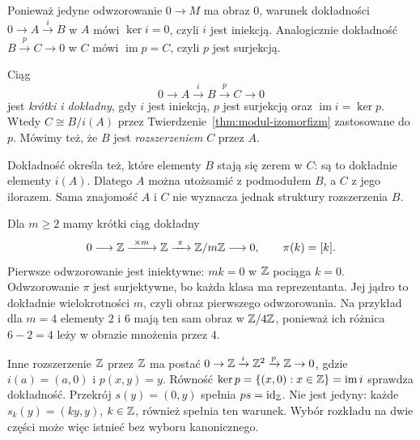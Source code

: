 Ponieważ jedyne odwzorowanie $0\to M$ ma obraz $0$,
warunek dokładności $0\to A\xrightarrow{i}B$
w $A$ mówi $\ker i=0$, czyli $i$ jest iniekcją.
Analogicznie dokładność
$B\xrightarrow{p}C\to0$ w $C$ mówi
$\operatorname{im}p=C$, czyli $p$ jest surjekcją.

\begin{definicja}
\label{def:krotki-ciag}
Ciąg
\begin{equation}\label{eq:krotki-ciag}
 0\longrightarrow A\xrightarrow{i}B
   \xrightarrow{p}C\longrightarrow0
\end{equation}
jest \emph{krótki i dokładny}, gdy $i$ jest
iniekcją, $p$ jest surjekcją oraz
$\operatorname{im}i=\ker p$.
Wtedy $C\cong B/i(A)$ przez
Twierdzenie~\ref{thm:modul-izomorfizm}
zastosowane do $p$. Mówimy też,
że $B$ jest \emph{rozszerzeniem} $C$ przez $A$.
\end{definicja}

Dokładność określa też, które elementy $B$ stają się
zerem w $C$: są to dokładnie elementy $i(A)$.
Dlatego $A$ można utożsamić z podmodułem $B$,
a $C$ z jego ilorazem. Sama znajomość $A$ i $C$
nie wyznacza jednak struktury rozszerzenia $B$.

\begin{przyklad}
\label{prz:ses-mod-m}
Dla $m\geq2$ mamy krótki ciąg dokładny
\[
 0\longrightarrow\mathbb{Z}\xrightarrow{\ \times m\ }\mathbb{Z}
   \xrightarrow{\ \pi\ }\mathbb{Z}/m\mathbb{Z}\longrightarrow0,
 \qquad \pi(k)=[k].
\]
Pierwsze odwzorowanie jest iniektywne: $mk=0$
w $\mathbb{Z}$ pociąga $k=0$. Odwzorowanie $\pi$ jest
surjektywne, bo każda klasa ma reprezentanta.
Jej jądro to dokładnie wielokrotności $m$,
czyli obraz pierwszego odwzorowania.
Na przykład dla $m=4$ elementy $2$ i $6$ mają
ten sam obraz w $\mathbb{Z}/4\mathbb{Z}$, ponieważ ich różnica
$6-2=4$ leży w obrazie mnożenia przez $4$.
\end{przyklad}

\begin{przyklad}
\label{prz:ses-z2}
Inne rozszerzenie $\mathbb{Z}$ przez $\mathbb{Z}$ ma postać
$0\to\mathbb{Z}\xrightarrow{i}\mathbb{Z}^2\xrightarrow{p}\mathbb{Z}\to0$,
gdzie $i(a)=(a,0)$ i $p(x,y)=y$.
Równość $\ker p=\{(x,0):x\in\mathbb{Z}\}=\operatorname{im}i$
sprawdza dokładność. Przekrój $s(y)=(0,y)$
spełnia $ps=\mathrm{id}_{\mathbb{Z}}$. Nie jest jedyny:
każde $s_k(y)=(ky,y)$, $k\in\mathbb{Z}$, również
spełnia ten warunek. Wybór rozkładu na dwie
części może więc istnieć bez wyboru kanonicznego.
\end{przyklad}

